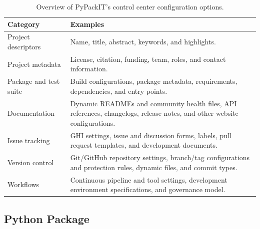 \documentclass{article}
\begin{document}
\begin{table}[h!]
\centering
\caption{Overview of PyPackIT's control center configuration options.}
\label{table:control-center-options}
\begin{tabularx}{\textwidth}{>{\raggedright\arraybackslash}p{} >{\raggedright\arraybackslash}X}
\toprule
\rowcolor{white} \textbf{Category} & \textbf{Examples}\\
\midrule

Project descriptors & Name, title, abstract, keywords, and highlights.\\

Project metadata & License, citation, funding, team, roles, and contact information.\\

Package and test suite & Build configurations, package metadata, requirements, dependencies, and entry points.\\

Documentation & Dynamic READMEs and community health files, API references, changelogs, release notes, and other website configurations.\\

Issue tracking & GHI settings, issue and discussion forms, labels, pull request templates, and development documents.\\

Version control & Git/GitHub repository settings, branch/tag configurations and protection rules, dynamic files, and commit types.\\

Workflows & Continuous pipeline and tool settings, development environment specifications, and governance model.\\
\bottomrule
\end{tabularx}
\end{table}

\subsection{Python Package}
\end{document}
